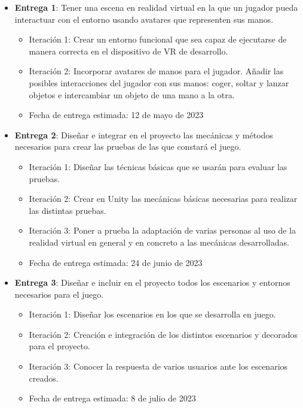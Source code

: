 \begin{itemize}
	\item{\textbf{Entrega 1}: Tener una escena en realidad virtual en la que un jugador pueda interactuar con el entorno usando avatares que representen sus manos.
		\begin{itemize}
			\item{Iteración 1: Crear un entorno funcional que sea capaz de ejecutarse de manera correcta en el dispositivo de VR de desarrollo.}
			\item{Iteración 2: Incorporar avatares de manos para el jugador. Añadir las posibles interacciones del jugador con sus manos: coger, soltar y lanzar objetos e intercambiar un objeto de una mano a la otra.}
			\item{Fecha de entrega estimada: 12 de mayo de 2023}
		\end{itemize}	
	}

	\item{\textbf{Entrega 2}: Diseñar e integrar en el proyecto las mecánicas y métodos necesarios para crear las pruebas de las que constará el juego.
		\begin{itemize}
			\item{Iteración 1: Diseñar las técnicas básicas que se usarán para evaluar las pruebas.}
			\item{Iteración 2: Crear en Unity las mecánicas básicas necesarias para realizar las distintas pruebas.}
			\item{Iteración 3: Poner a prueba la adaptación de varias personas al uso de la realidad virtual en general y en concreto a las mecánicas desarrolladas.}
			\item{Fecha de entrega estimada: 24 de junio de 2023}
		\end{itemize}	
	}
		
	\item{\textbf{Entrega 3}: Diseñar e incluir en el proyecto todos los escenarios y entornos necesarios para el juego.
	\begin{itemize}
		\item{Iteración 1: Diseñar los escenarios en los que se desarrolla en juego.}
		\item{Iteración 2: Creación e integración de los distintos escenarios y decorados para el proyecto.}
		\item{Iteración 3: Conocer la respuesta de varios usuarios ante los escenarios creados.}
		\item{Fecha de entrega estimada: 8 de julio de 2023}
	\end{itemize}	
	}


\end{itemize}
